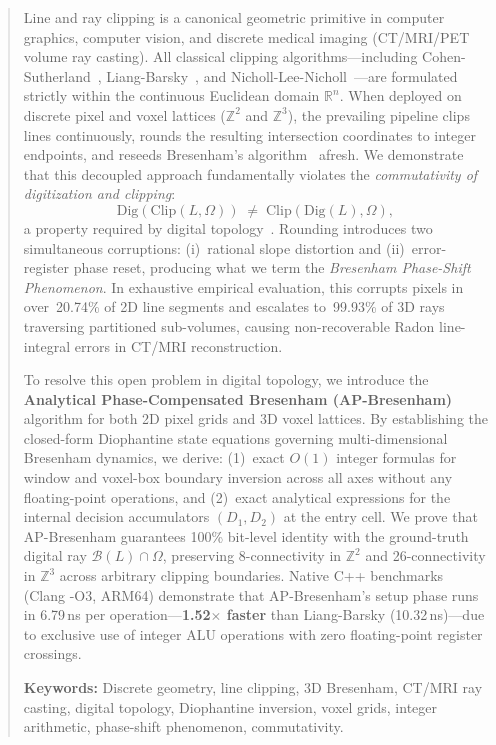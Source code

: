 \documentclass[12pt,a4paper]{article}
\theoremstyle{definition}
\newcommand{\R}{\mathbb{R}}
\newcommand{\Zt}{\mathbb{Z}^2}
\newcommand{\Zth}{\mathbb{Z}^3}
\newcommand{\Clip}{\mathrm{Clip}}
\newcommand{\Dig}{\mathrm{Dig}}
\newcommand{\Bresen}{\mathcal{B}}
\begin{document}
\begin{abstract}
Line and ray clipping is a canonical geometric primitive
in computer graphics, computer vision, and discrete medical
imaging (CT/MRI/PET volume ray casting). All classical
clipping algorithms---including
Cohen-Sutherland~\cite{sproull1968clipping},
Liang-Barsky~\cite{liang1984new}, and
Nicholl-Lee-Nicholl~\cite{nicholl1987efficient}---are
formulated strictly within the continuous Euclidean domain
$\R^n$. When deployed on discrete pixel and voxel lattices
($\Zt$ and $\Zth$), the prevailing pipeline clips lines
continuously, rounds the resulting intersection coordinates
to integer endpoints, and reseeds Bresenham's
algorithm~\cite{bresenham1965algorithm} afresh.  We
demonstrate that this decoupled approach fundamentally
violates the \emph{commutativity of digitization and
clipping}:
\[
  \Dig(\Clip(L,\Omega)) \;\ne\; \Clip(\Dig(L),\Omega),
\]
a property required by digital
topology~\cite{klette2004digital,kong1989digital}.  Rounding
introduces two simultaneous corruptions: (i)~rational slope
distortion and (ii)~error-register phase reset, producing
what we term the \emph{Bresenham Phase-Shift Phenomenon}.
In exhaustive empirical evaluation, this corrupts pixels in
over~20.74\% of 2D line segments and escalates to~99.93\%
of 3D rays traversing partitioned sub-volumes, causing
non-recoverable Radon line-integral errors in CT/MRI
reconstruction.

To resolve this open problem in digital topology, we
introduce the \textbf{Analytical Phase-Compensated
Bresenham (AP-Bresenham)} algorithm for both 2D pixel
grids and 3D voxel lattices.  By establishing the
closed-form Diophantine state equations governing
multi-dimensional Bresenham dynamics, we derive:
(1)~exact $O(1)$ integer formulas for window and voxel-box
boundary inversion across all axes without any
floating-point operations, and (2)~exact analytical
expressions for the internal decision accumulators
$(D_1, D_2)$ at the entry cell.  We prove that
AP-Bresenham guarantees 100\% bit-level identity with
the ground-truth digital ray $\Bresen(L)\cap\Omega$,
preserving 8-connectivity in $\Zt$ and 26-connectivity
in $\Zth$ across arbitrary clipping boundaries. Native
C++ benchmarks (Clang -O3, ARM64) demonstrate that
AP-Bresenham's setup phase runs in 6.79\,ns per
operation---\textbf{1.52$\times$ faster} than
Liang-Barsky (10.32\,ns)---due to exclusive use of
integer ALU operations with zero floating-point register
crossings.

\noindent\textbf{Keywords:} Discrete geometry, line
clipping, 3D Bresenham, CT/MRI ray casting, digital
topology, Diophantine inversion, voxel grids, integer
arithmetic, phase-shift phenomenon, commutativity.
\end{abstract}
\end{document}
